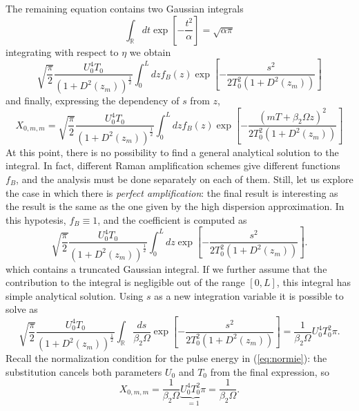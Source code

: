 \documentclass[10pt, lettersize, journal, onecolumn]{IEEEtran}
\begin{document}
The remaining equation contains two Gaussian integrals
\begin{equation}
	\int_{\mathbb{R}}dt \exp\left[-\dfrac{t^2}{\alpha}\right] = \sqrt{\alpha \pi} 
\end{equation}
integrating with respect to $\eta$ we obtain
\begin{equation}
	\sqrt{\dfrac{\pi}{2}}\dfrac{U_0^4 T_0}{(1+D^2(z_m))^{\frac{1}{2}}} \int_{0}^{L} dz f_B(z) \exp\left[-\dfrac{s^2}{2T_0^2(1+D^2(z_m))} \right]
\end{equation}
and finally, expressing the dependency of $s$ from $z$, 
\begin{equation}\label{THE_INTEGRAL}
	X_{0, m, m} = \sqrt{\dfrac{\pi}{2}}\dfrac{U_0^4 T_0}{(1+D^2(z_m))^{\frac{1}{2}}} \int_{0}^{L} dz f_B(z) \exp\left[-\dfrac{(mT+\beta_2\Omega z)^2}{2T_0^2(1+D^2(z_m))} \right]
\end{equation} 
At this point, there is no possibility to find a general analytical solution to the integral. In fact, different Raman amplification schemes give different functions $f_B$, and the analysis must be done separately on each of them. 
Still, let us explore the case in which there is \textit{perfect amplification}: the final result is interesting as the result is the same as the one given by the high dispersion approximation. In this hypotesis, $f_B \equiv 1$, and the coefficient is computed as
\begin{equation}\label{pa-first}
	\sqrt{\dfrac{\pi}{2}}\dfrac{U_0^4 T_0}{(1+D^2(z_m))^{\frac{1}{2}}} \int_{0}^{L}dz \exp\left[-\dfrac{s^2}{2T_0^2(1+D^2(z_m))} \right].
\end{equation}
which contains a truncated Gaussian integral. If we further assume that the contribution to the integral is negligible out of the range $[0, L]$, this integral has simple analytical solution.
Using $s$ as a new integration variable it is possible to solve as
\begin{equation}
	\sqrt{\dfrac{\pi}{2}}\dfrac{U_0^4 T_0}{(1+D^2(z_m))^{\frac{1}{2}}} \int_{\mathbb{R}} \dfrac{ds}{\beta_2 \Omega} \exp\left[-\dfrac{s^2}{2T_0^2(1+D^2(z_m))} \right] = \dfrac{1}{\beta_2 \Omega} U_0^4 T_0^2 \pi.
\end{equation}
Recall the normalization condition for the pulse energy in (\ref{eq:normie}): the substitution cancels both parameters $U_0$ and $T_0$ from the final expression, so
\begin{equation}\label{pa-last}
	X_{0, m, m} = \dfrac{1}{\beta_2 \Omega} \underbrace{U_0^4 T_0^2 \pi}_{=1} = \dfrac{1}{\beta_2 \Omega}.
\end{equation}
\end{document}

